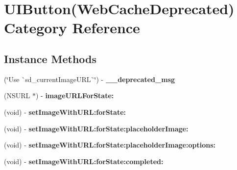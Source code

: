 \hypertarget{category_u_i_button_07_web_cache_deprecated_08}{}\section{U\+I\+Button(Web\+Cache\+Deprecated) Category Reference}
\label{category_u_i_button_07_web_cache_deprecated_08}
\subsection*{Instance Methods}
\begin{DoxyCompactItemize}
\item 
\mbox{\label{category_u_i_button_07_web_cache_deprecated_08_a9abef11d7c09d7ab93a5e9bf531e3311}} 
(\char`\"{}Use \`{}sd\+\_\+current\+Image\+U\+RL\`{}\char`\"{}) -\/ {\bfseries \+\_\+\+\_\+deprecated\+\_\+msg}
\item 
\mbox{\label{category_u_i_button_07_web_cache_deprecated_08_a6ead91154847e0ebb1a993442b3b06c8}} 
(N\+S\+U\+RL $\ast$) -\/ {\bfseries image\+U\+R\+L\+For\+State\+:}
\item 
\mbox{\label{category_u_i_button_07_web_cache_deprecated_08_aa6120dbf869e6fe383ec2f46beb4e9c7}} 
(void) -\/ {\bfseries set\+Image\+With\+U\+R\+L\+:for\+State\+:}
\item 
\mbox{\label{category_u_i_button_07_web_cache_deprecated_08_a55ba1d03ef9670bfe0c81377272a204e}} 
(void) -\/ {\bfseries set\+Image\+With\+U\+R\+L\+:for\+State\+:placeholder\+Image\+:}
\item 
\mbox{\label{category_u_i_button_07_web_cache_deprecated_08_a6889b9b882c09274db7401a36ada5a82}} 
(void) -\/ {\bfseries set\+Image\+With\+U\+R\+L\+:for\+State\+:placeholder\+Image\+:options\+:}
\item 
\mbox{\label{category_u_i_button_07_web_cache_deprecated_08_a642e0c31ee4bf21d06d50aadefe92290}} 
(void) -\/ {\bfseries set\+Image\+With\+U\+R\+L\+:for\+State\+:completed\+:}

\end{DoxyCompactItemize}
